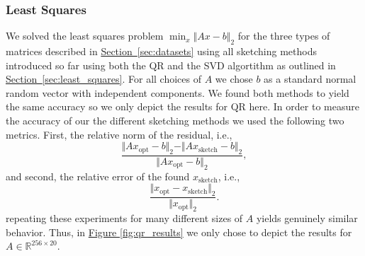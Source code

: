 \documentclass{article}
\begin{document}
\subsubsection{Least Squares}
We solved the least squares problem $\min_x \Vert Ax - b \Vert_2$ for the three types of matrices described in \hyperref[sec:datasets]{Section~\ref*{sec:datasets}} using all sketching methods introduced so far using both the QR and the SVD algortithm as outlined in \hyperref[sec:least_squares]{Section~\ref*{sec:least_squares}}. For all choices of $A$ we chose $b$ as a standard normal random vector with independent components. We found both methods to yield the same accuracy so we only depict the results for QR here. 
In order to measure the accuracy of our the different sketching methods we used the following two metrics. First, the relative norm of the residual, i.e.,
$$
\frac{\Vert Ax_{\mathrm{opt}} - b \Vert_2 - \Vert Ax_{\mathrm{sketch}} - b \Vert_2}{\Vert Ax_{\mathrm{opt}} - b \Vert_2},
$$
and second, the relative error of the found $x_{\mathrm{sketch}}$, i.e.,
$$
\frac{\Vert x_{\mathrm{opt}} - x_{\mathrm{sketch}}\Vert_2} {\Vert x_{\mathrm{opt}} \Vert_2}.
$$
repeating these experiments for many different sizes of $A$ yields genuinely similar behavior. Thus, in \hyperref[fig:qr_results]{Figure \ref*{fig:qr_results}} we only chose to depict the results for $A \in \mathbb{R}^{256 \times 20}$. 
\end{document}
